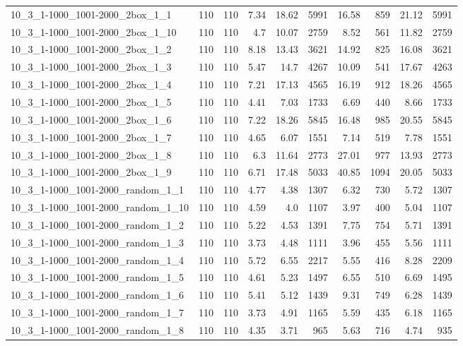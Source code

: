 \begin{center}
\begin{scriptsize}
\begin{longtable}{lrrrrrrrrr}
10\_3\_1-1000\_1001-2000\_2box\_1\_1 & 110 & 110 & 7.34 & 18.62 & 5991 & 16.58 & 859 & 21.12 & 5991\\
10\_3\_1-1000\_1001-2000\_2box\_1\_10 & 110 & 110 & 4.7 & 10.07 & 2759 & 8.52 & 561 & 11.82 & 2759\\
10\_3\_1-1000\_1001-2000\_2box\_1\_2 & 110 & 110 & 8.18 & 13.43 & 3621 & 14.92 & 825 & 16.08 & 3621\\
10\_3\_1-1000\_1001-2000\_2box\_1\_3 & 110 & 110 & 5.47 & 14.7 & 4267 & 10.09 & 541 & 17.67 & 4263\\
10\_3\_1-1000\_1001-2000\_2box\_1\_4 & 110 & 110 & 7.21 & 17.13 & 4565 & 16.19 & 912 & 18.26 & 4565\\
10\_3\_1-1000\_1001-2000\_2box\_1\_5 & 110 & 110 & 4.41 & 7.03 & 1733 & 6.69 & 440 & 8.66 & 1733\\
10\_3\_1-1000\_1001-2000\_2box\_1\_6 & 110 & 110 & 7.22 & 18.26 & 5845 & 16.48 & 985 & 20.55 & 5845\\
10\_3\_1-1000\_1001-2000\_2box\_1\_7 & 110 & 110 & 4.65 & 6.07 & 1551 & 7.14 & 519 & 7.78 & 1551\\
10\_3\_1-1000\_1001-2000\_2box\_1\_8 & 110 & 110 & 6.3 & 11.64 & 2773 & 27.01 & 977 & 13.93 & 2773\\
10\_3\_1-1000\_1001-2000\_2box\_1\_9 & 110 & 110 & 6.71 & 17.48 & 5033 & 40.85 & 1094 & 20.05 & 5033\\
10\_3\_1-1000\_1001-2000\_random\_1\_1 & 110 & 110 & 4.77 & 4.38 & 1307 & 6.32 & 730 & 5.72 & 1307\\
10\_3\_1-1000\_1001-2000\_random\_1\_10 & 110 & 110 & 4.59 & 4.0 & 1107 & 3.97 & 400 & 5.04 & 1107\\
10\_3\_1-1000\_1001-2000\_random\_1\_2 & 110 & 110 & 5.22 & 4.53 & 1391 & 7.75 & 754 & 5.71 & 1391\\
10\_3\_1-1000\_1001-2000\_random\_1\_3 & 110 & 110 & 3.73 & 4.48 & 1111 & 3.96 & 455 & 5.56 & 1111\\
10\_3\_1-1000\_1001-2000\_random\_1\_4 & 110 & 110 & 5.72 & 6.55 & 2217 & 5.55 & 416 & 8.28 & 2209\\
10\_3\_1-1000\_1001-2000\_random\_1\_5 & 110 & 110 & 4.61 & 5.23 & 1497 & 6.55 & 510 & 6.69 & 1495\\
10\_3\_1-1000\_1001-2000\_random\_1\_6 & 110 & 110 & 5.41 & 5.12 & 1439 & 9.31 & 749 & 6.28 & 1439\\
10\_3\_1-1000\_1001-2000\_random\_1\_7 & 110 & 110 & 3.73 & 4.91 & 1165 & 5.59 & 435 & 6.18 & 1165\\
10\_3\_1-1000\_1001-2000\_random\_1\_8 & 110 & 110 & 4.35 & 3.71 & 965 & 5.63 & 716 & 4.74 & 935\\

\end{longtable}
\end{scriptsize}
\end{center}
